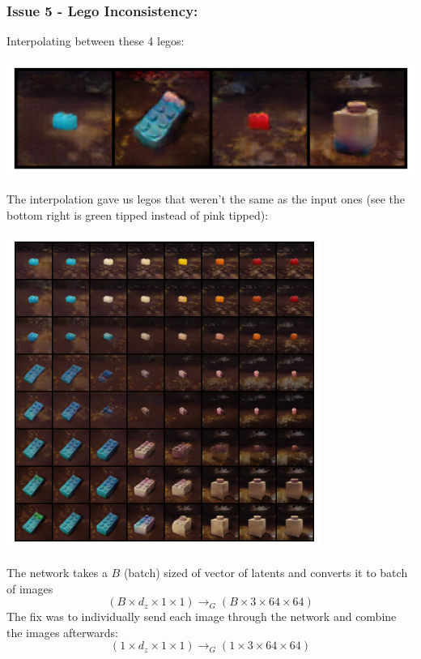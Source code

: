 \documentclass{article}
\begin{document}
\newpage
\subsubsection*{Issue 5 - Lego Inconsistency:}
Interpolating between these 4 legos:
\begin{center}
\includegraphics[scale=0.75]{./imgs/seed_69,0,23,42,62_legos}
\end{center}

\noindent The interpolation gave us legos that weren't the same as the input ones
(see the bottom right is green tipped instead of pink tipped):
\begin{center}
\includegraphics[scale=1]{./imgs/seed_69,0,23,42,62_wrong}
\end{center}

The network takes a $B$ (batch) sized of vector of latents and
converts it to batch of images
$$
(B \times d_z \times 1 \times 1)
\rightarrow_{G}
(B \times 3 \times 64 \times 64)
$$
The fix was to individually send each image through the network and combine the images
afterwards: 
$$
(1 \times d_z \times 1 \times 1)
\rightarrow_{G}
(1 \times 3 \times 64 \times 64)
$$
\end{document}
